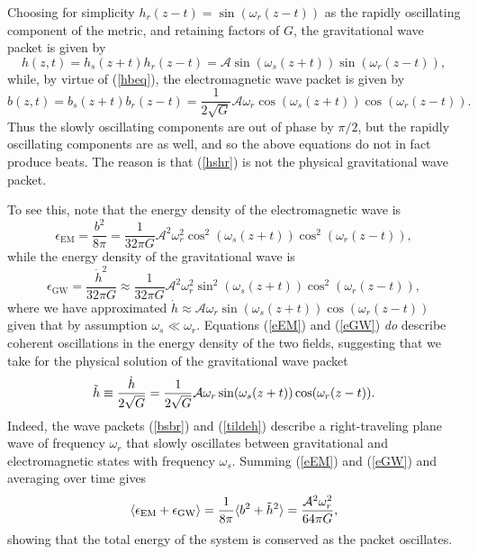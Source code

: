 \documentclass[12pt]{article}
\begin{document}
Choosing for simplicity $h_r(z-t) = \sin(\omega_r(z-t))$ as the rapidly oscillating component of the metric, and retaining factors of $G$, the gravitational wave packet is given by
\begin{equation}\label{hshr}
    h(z,t) = h_s(z+t) h_r(z-t) = \mathcal{A} \sin(\omega_s(z+t)) \sin(\omega_r(z-t)),
\end{equation}
while, by virtue of (\ref{hbeq}), the electromagnetic wave packet is given by
\begin{equation}\label{bsbr}
    b(z,t) = b_s(z+t) b_r(z-t) = \frac{1}{2 \sqrt{G}}\mathcal{A} \omega_r \cos(\omega_s(z+t)) \cos(\omega_r(z-t)).
\end{equation}
Thus the slowly oscillating components are out of phase by $\pi/2$, but the rapidly oscillating components are as well, and so the above equations  do not in fact produce beats. The reason is that (\ref{hshr}) is not the physical gravitational wave packet. 

To see this, note that the energy density of the electromagnetic wave is
\begin{equation}\label{eEM}
    \epsilon_{\text{EM}} = \frac{b^2}{8 \pi} = \frac{1}{32 \pi G} \mathcal{A}^2 \omega_r^2 \cos^2(\omega_s(z+t)) \cos^2(\omega_r(z-t)),
\end{equation}
while the energy density of the gravitational wave is
\begin{equation}\label{eGW}
     \epsilon_{\text{GW}} = \frac{\dot{h}^2}{32 \pi G} \approx \frac{1}{32 \pi G} \mathcal{A}^2 \omega_r^2 \sin^2(\omega_s(z+t)) \cos^2(\omega_r(z-t)),
\end{equation}
where we have approximated $\dot{h} \approx \mathcal{A} \omega_r \sin(\omega_s(z+t)) \cos(\omega_r(z-t))$ given that by assumption $\omega_s \ll \omega_r$. Equations (\ref{eEM}) and (\ref{eGW}) \textit{do} describe coherent oscillations in the energy density of the two fields,  suggesting that we take for the physical solution of the gravitational wave packet
\begin{equation}\label{tildeh}
    \Tilde{h} \equiv \frac{\dot{h}}{2 \sqrt{G}} = \frac{1}{2 \sqrt{G}}\mathcal{A} \omega_r \sin(\omega_s(z+t)) \cos(\omega_r(z-t)).
\end{equation}
Indeed, the wave packets (\ref{bsbr}) and (\ref{tildeh}) describe a right-traveling plane wave of frequency $\omega_r$ that slowly oscillates between gravitational and electromagnetic states with frequency $\omega_s$. Summing (\ref{eEM}) and (\ref{eGW}) and averaging over time gives
\begin{equation}\label{energycons}
    \langle \epsilon_{\text{EM}} + \epsilon_{\text{GW}} \rangle = \frac{1}{8 \pi} \langle b^2 + \Tilde{h}^2 \rangle = \frac{\mathcal{A}^2 \omega_r^2}{64 \pi G},
\end{equation}
showing that the total energy of the system is conserved as the packet oscillates.
\end{document}
